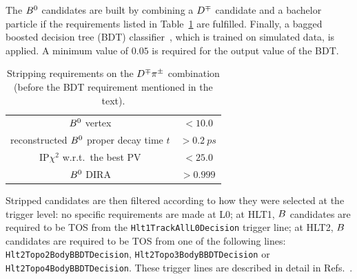 %
The $B^0$ candidates are built by combining a $D^\mp$ candidate and a bachelor
particle if the requirements listed in Table~\ref{tab:strippingB} are fulfilled.
Finally, a bagged boosted decision tree (BDT) classifier~\cite{Breiman:1996zz}, which is trained on
simulated data, is applied. A
minimum value of $\num{0.05}$ is required for the output value of the BDT.
%
\begin{table}[htbp]
	\centering
	\caption{Stripping requirements on the $D^\mp\pi^\pm$ combination (before the BDT requirement mentioned in the text).}
	\begin{tabular}{cc}
		\toprule
		$B^0$ vertex \chisqndf & $<\num{10.0}$\\
		reconstructed $B^0$ proper decay time $t$ & $>\SI{0.2}{ps}$\\
		IP$\chi^2$ w.r.t.\ the best PV & $<\num{25.0}$\\
		$B^0$ DIRA & $>\num{0.999}$\\
		\bottomrule
	\end{tabular}
	\label{tab:strippingB}
\end{table}
%
Stripped candidates are then filtered according to how they were selected at the
trigger level: no specific requirements are made at L0; at HLT1, $B$ candidates
are required to be TOS from the \verb!Hlt1TrackAllL0Decision! trigger line; at
HLT2, $B$ candidates are required to be TOS from one of the following lines:
\verb!Hlt2Topo2BodyBBDTDecision!, \verb!Hlt2Topo3BodyBBDTDecision! or
\verb!Hlt2Topo4BodyBBDTDecision!. These trigger lines are described in detail in 
Refs.~\cite{LHCb-PUB-2011-003Vava,LHCb-INT-2011-030Vava}.

